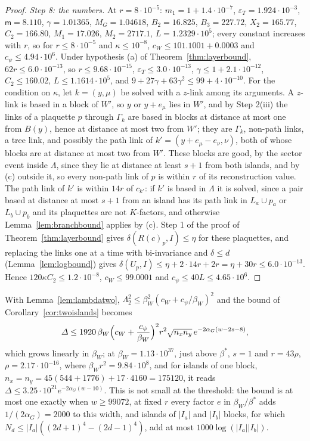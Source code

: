 \documentclass[11pt]{amsart}
\theoremstyle{definition}
\theoremstyle{remark}
\numberwithin{equation}{section}
\begin{document}
\begin{proof}
\emph{Step 8: the numbers.} At $r=8\cdot10^{-5}$: $m_1=1+1.4\cdot10^{-7}$,
$\varepsilon_T=1.924\cdot10^{-3}$, $\mathsf m=8.110$, $\gamma=1.01365$,
$M_G=1.04618$, $B_2=16.825$, $B_3=227.72$, $X_2=165.77$, $C_2=166.80$,
$M_1=17.026$, $M_2=2717.1$, $L=1.2329\cdot10^5$; every constant increases
with $r$, so for $r\le8\cdot10^{-5}$ and $\kappa\le10^{-8}$,
$c_W\le101.1001+0.0003$ and $c_\psi\le4.94\cdot10^6$. Under hypothesis (a)
of Theorem~\ref{thm:layerbound}, $62r\le6.0\cdot10^{-13}$, so
$r\le9.68\cdot10^{-15}$, $\varepsilon_T\le3.0\cdot10^{-13}$, $\gamma\le
1+2.1\cdot10^{-12}$, $C_2\le160.02$, $L\le1.1614\cdot10^5$, and
$9+27\gamma+63\gamma^2\le99+4\cdot10^{-10}$. For the condition on
$\kappa$, let $k=(y,\mu)$ be solved with a $z$-link among its arguments.
A $z$-link is based in a block of $W'$, so $y$ or $y+e_\mu$ lies in $W'$,
and by Step 2(iii) the links of a plaquette $p$ through $\Gamma_k$ are
based in blocks at distance at most one from $B(y)$, hence at distance at
most two from $W'$; they are $\Gamma_k$, non-path links, a tree link, and
possibly the path link of $k'=(y+e_\mu-e_\nu,\nu)$, both of whose blocks
are at distance at most two from $W'$. These blocks are good, by the
sector event inside $\Lambda$, since they lie at distance at least $s+1$
from both islands, and by (c) outside it, so every non-path link of $p$
is within $r$ of its reconstruction value. The path link of $k'$ is within
$14r$ of $c_{k'}$: if $k'$ is based in $\Lambda$ it is solved, since a
pair based at distance at most $s+1$ from an island has its path link in
$L_a\cup p_a$ or $L_b\cup p_b$ and its plaquettes are not $K$-factors, and
otherwise Lemma~\ref{lem:branchbound} applies by (c). Step 1 of the proof
of Theorem~\ref{thm:layerbound} gives $\delta(R(c)_p,I)\le\eta$ for these
plaquettes, and replacing the links one at a time with bi-invariance and
$\delta\le d$ (Lemma~\ref{lem:logbound}) gives
$\delta(U_p,I)\le\eta+2\cdot14r+2r=\eta+30r\le6.0\cdot10^{-13}$. Hence
$120\kappa C_2\le1.2\cdot10^{-8}$, $c_W\le99.0001$ and $c_\psi\le40L\le
4.65\cdot10^6$.
\end{proof}

With Lemma~\ref{lem:lambdatwo}, $\Lambda_2^2\le\beta_W^2(c_W+c_\psi/
\beta_W)^2$ and the bound of Corollary~\ref{cor:twoislands} becomes
\[
\varDelta\le1920\,\beta_W\Bigl(c_W+\frac{c_\psi}{\beta_W}\Bigr)^2r^2
\sqrt{n_xn_y}\,e^{-2\alpha_G(w-2s-8)},
\]
which grows linearly in $\beta_W$; at
$\beta_W=1.13\cdot10^{37}$, just above $\beta^*$, $s=1$ and $r=43\rho$,
$\rho=2.17\cdot10^{-16}$, where $\beta_Wr^2=9.84\cdot10^8$, and for
islands of one block, $n_x=n_y=45(544+1776)+17\cdot4160=175120$, it reads
$\varDelta\le3.25\cdot10^{21}e^{-2\alpha_G(w-10)}$. This is not small at
the threshold: the bound is at most one exactly when $w\ge99072$, at
fixed $r$ every factor $e$ in $\beta_W/\beta^*$ adds $1/(2\alpha_G)=2000$
to this width, and islands of
$\lvert I_a\rvert$ and $\lvert I_b\rvert$ blocks, for which
$N_d\le\lvert I_a\rvert((2d+1)^4-(2d-1)^4)$, add at most
$1000\log(\lvert I_a\rvert\lvert I_b\rvert)$.
\end{document}
